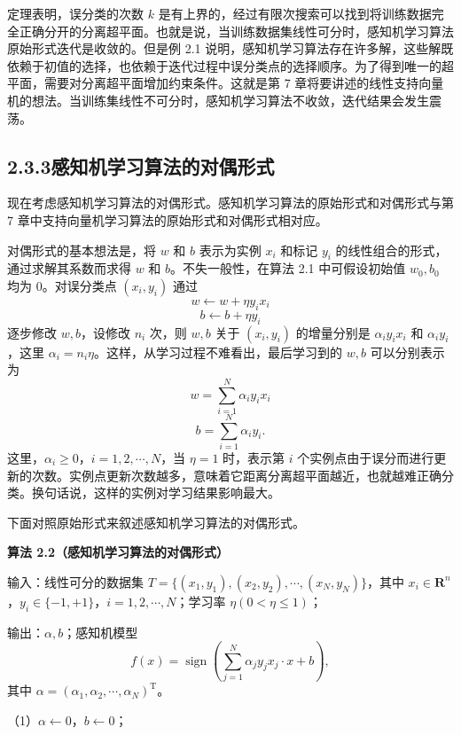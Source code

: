 \documentclass[UTF8,12pt,a4paper,fontset=fandol]{ctexart}
\begin{document}
定理表明，误分类的次数 $k$ 是有上界的，经过有限次搜索可以找到将训练数据完全正确分开的分离超平面。也就是说，当训练数据集线性可分时，感知机学习算法原始形式迭代是收敛的。但是例 2.1 说明，感知机学习算法存在许多解，这些解既依赖于初值的选择，也依赖于迭代过程中误分类点的选择顺序。为了得到唯一的超平面，需要对分离超平面增加约束条件。这就是第 7 章将要讲述的线性支持向量机的想法。当训练集线性不可分时，感知机学习算法不收敛，迭代结果会发生震荡。

\subsection*{2.3.3\quad 感知机学习算法的对偶形式}

现在考虑感知机学习算法的对偶形式。感知机学习算法的原始形式和对偶形式与第 7 章中支持向量机学习算法的原始形式和对偶形式相对应。

对偶形式的基本想法是，将 $w$ 和 $b$ 表示为实例 $x_i$ 和标记 $y_i$ 的线性组合的形式，通过求解其系数而求得 $w$ 和 $b$。不失一般性，在算法 2.1 中可假设初始值 $w_0,b_0$ 均为 0。对误分类点 $(x_i,y_i)$ 通过
\[
  w\leftarrow w+\eta y_ix_i
\]
\[
  b\leftarrow b+\eta y_i
\]
逐步修改 $w,b$，设修改 $n_i$ 次，则 $w,b$ 关于 $(x_i,y_i)$ 的增量分别是 $\alpha_iy_ix_i$ 和 $\alpha_iy_i$，这里 $\alpha_i=n_i\eta$。这样，从学习过程不难看出，最后学习到的 $w,b$ 可以分别表示为
\begin{equation}
  w=\sum_{i=1}^N\alpha_iy_ix_i
  \tag{2.14}
\end{equation}
\begin{equation}
  b=\sum_{i=1}^N\alpha_iy_i.
  \tag{2.15}
\end{equation}
这里，$\alpha_i\ge 0$，$i=1,2,\cdots,N$，当 $\eta=1$ 时，表示第 $i$ 个实例点由于误分而进行更新的次数。实例点更新次数越多，意味着它距离分离超平面越近，也就越难正确分类。换句话说，这样的实例对学习结果影响最大。

下面对照原始形式来叙述感知机学习算法的对偶形式。

\noindent\textbf{算法 2.2（感知机学习算法的对偶形式）}

\noindent 输入：线性可分的数据集 $T=\{(x_1,y_1),(x_2,y_2),\cdots,(x_N,y_N)\}$，其中 $x_i\in\mathbf{R}^n$，$y_i\in\{-1,+1\}$，$i=1,2,\cdots,N$；学习率 $\eta(0<\eta\le 1)$；

\noindent 输出：$\alpha,b$；感知机模型
\[
  f(x)=\operatorname{sign}\left(\sum_{j=1}^N\alpha_jy_jx_j\cdot x+b\right),
\]
其中 $\alpha=(\alpha_1,\alpha_2,\cdots,\alpha_N)^\mathrm{T}$。

（1）$\alpha\leftarrow 0$，$b\leftarrow 0$；
\end{document}
